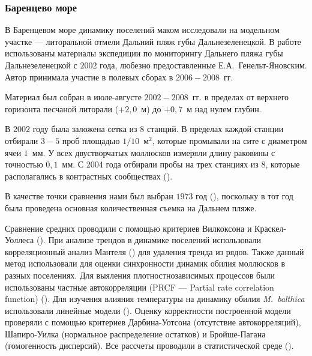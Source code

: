 \afterpage{\clearpage}

        \subsubsection{Баренцево море}

В Баренцевом море динамику поселений маком исследовали на модельном участке --- литоральной отмели Дальний пляж губы Дальнезеленецкой. 
В работе использованы материалы экспедиции по мониторингу Дальнего пляжа губы Дальнезеленецкой с $2002$ года, любезно предоставленные Е.\:А.~Генельт-Яновским.
Автор принимала участие в полевых сборах в $2006 - 2008$~гг.

Материал был собран в июле-августе $2002 - 2008$~гг. в пределах от верхнего горизонта песчаной литорали ($+2,0$~м) до $+0,7$~м над нулем глубин. 

 В $2002$ году была заложена сетка из $8$ станций. 
 В пределах каждой станции отбирали $3 - 5$ проб площадью $1/10$~м$^2$, которые промывали на сите с диаметром ячеи $1$~мм. 
 У всех двустворчатых моллюсков измеряли длину раковины с точностью $0,1$~мм. 
 С 2004 года отбирали пробы на трех станциях из $8$, которые располагались в контрастных сообществах (\cite{Genelt_Dalnezeleneckaya_2008}). 

В качестве точки сравнения нами был выбран $1973$ год (\cite{Streltsov_et_al_1974, Agarova_et_al_1976}), поскольку в тот год была проведена основная количественная съемка на Дальнем пляже. 


Сравнение средних проводили с помощью критериев Вилкоксона и Краскел-Уоллеса (\cite{Hollander_et_al_2013}).
При анализе трендов в динамике поселений использовали корреляционный анализ Мантеля (\cite{Legendre_Legendre_2012}) для удаления тренда из рядов. 
Также данный метод использовали для оценки синхронности динамик обилия моллюсков в разных поселениях.
Для выяления плотностнозависимых процессов были использованы частные автокорреляции (PRCF --- Partial rate correlation function) (\cite{Berryman_Turchin_2001}).
Для изучения влияния температуры на динамику обилия \textit{M.~balthica} использовали линейные модели (\cite{Chambers_Hastie_1991}).
Оценку корректности построенной модели проверяли с помощью критериев Дарбина-Уотсона (отсутствие автокорреляций), Шапиро-Уилка (нормальное распределение остатков) и Бройше-Пагана (гомогенность дисперсий).
Все рассчеты проводили в статистической среде \R{} (\cite{R_2014}).

